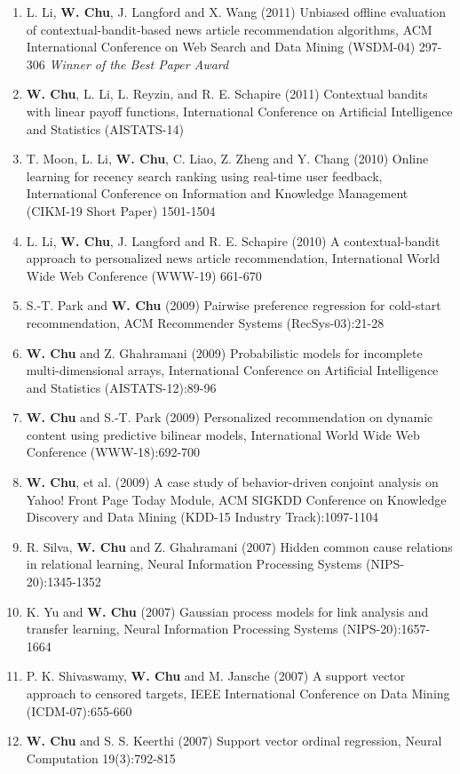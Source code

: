 \documentclass[line,10pt,final]{res}
\begin{document}
\begin{resume}
\begin{enumerate}
\item L. Li,  {\bf W. Chu}, J. Langford and X. Wang (2011) Unbiased offline evaluation of contextual-bandit-based news article recommendation algorithms, ACM International Conference on Web Search and Data Mining (WSDM-04) 297-306   {\em Winner of the Best Paper Award}
\item  {\bf W. Chu}, L. Li, L. Reyzin, and R. E. Schapire (2011) Contextual bandits with linear payoff functions, International Conference on Artificial Intelligence and Statistics (AISTATS-14)  
\item T. Moon, L. Li,  {\bf W. Chu}, C. Liao, Z. Zheng and Y. Chang (2010) Online learning for recency search ranking using real-time user feedback, International Conference on Information and Knowledge Management (CIKM-19 Short Paper) 1501-1504  
\item L. Li,  {\bf W. Chu}, J. Langford and R. E. Schapire (2010) A contextual-bandit approach to personalized news article recommendation, International World Wide Web Conference (WWW-19) 661-670  
\item S.-T. Park and  {\bf W. Chu} (2009) Pairwise preference regression for cold-start recommendation, ACM Recommender Systems (RecSys-03):21-28  
\item  {\bf W. Chu} and Z. Ghahramani (2009) Probabilistic models for incomplete multi-dimensional arrays, International Conference on Artificial Intelligence and Statistics (AISTATS-12):89-96  
\item  {\bf W. Chu} and S.-T. Park (2009) Personalized recommendation on dynamic content using predictive bilinear models, International World Wide Web Conference (WWW-18):692-700  
\item  {\bf W. Chu}, et al. (2009) A case study of behavior-driven conjoint analysis on Yahoo! Front Page Today Module, ACM SIGKDD Conference on Knowledge Discovery and Data Mining (KDD-15 Industry Track):1097-1104  
\item R. Silva,  {\bf W. Chu} and Z. Ghahramani (2007) Hidden common cause relations in relational learning, Neural Information Processing Systems (NIPS-20):1345-1352  
\item K. Yu and  {\bf W. Chu} (2007) Gaussian process models for link analysis and transfer learning, Neural Information Processing Systems (NIPS-20):1657-1664  
\item P. K. Shivaswamy,  {\bf W. Chu} and M. Jansche (2007) A support vector approach to censored targets, IEEE International Conference on Data Mining (ICDM-07):655-660  
\item  {\bf W. Chu} and S. S. Keerthi (2007)  Support vector ordinal regression,  Neural Computation 19(3):792-815  

\end{enumerate}
\end{resume}
\end{document}
